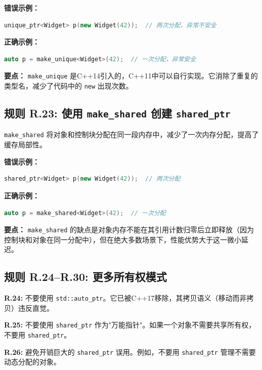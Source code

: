 \textbf{错误示例：}

\begin{lstlisting}[language=C++]
unique_ptr<Widget> p(new Widget(42));  // 两次分配，异常不安全
\end{lstlisting}

\textbf{正确示例：}

\begin{lstlisting}[language=C++]
auto p = make_unique<Widget>(42);  // 一次分配，异常安全
\end{lstlisting}

\textbf{要点：} \texttt{make\_unique} 是C++14引入的，C++11中可以自行实现。它消除了重复的类型名，减少了代码中的 \texttt{new} 出现次数。

\subsection*{\textbf{规则 R.23:} 使用 \texttt{make\_shared} 创建 \texttt{shared\_ptr}}

\texttt{make\_shared} 将对象和控制块分配在同一段内存中，减少了一次内存分配，提高了缓存局部性。

\textbf{错误示例：}

\begin{lstlisting}[language=C++]
shared_ptr<Widget> p(new Widget(42));  // 两次分配
\end{lstlisting}

\textbf{正确示例：}

\begin{lstlisting}[language=C++]
auto p = make_shared<Widget>(42);  // 一次分配
\end{lstlisting}

\textbf{要点：} \texttt{make\_shared} 的缺点是对象内存不能在其引用计数归零后立即释放（因为控制块和对象在同一分配中），但在绝大多数场景下，性能优势大于这一微小延迟。

\subsection*{\textbf{规则 R.24--R.30:} 更多所有权模式}

\textbf{R.24:} 不要使用 \texttt{std::auto\_ptr}。它已被C++17移除，其拷贝语义（移动而非拷贝）违反直觉。

\textbf{R.25:} 不要使用 \texttt{shared\_ptr} 作为"万能指针"。如果一个对象不需要共享所有权，不要用 \texttt{shared\_ptr}。

\textbf{R.26:} 避免开销巨大的 \texttt{shared\_ptr} 误用。例如，不要用 \texttt{shared\_ptr} 管理不需要动态分配的对象。

